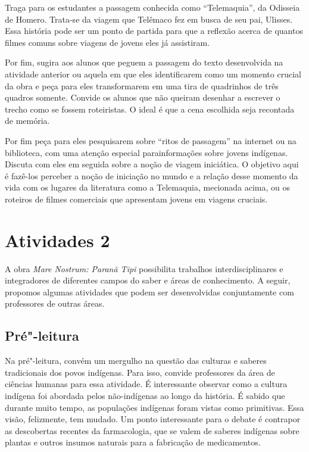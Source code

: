 \documentclass[12pt]{extarticle}
\begin{document}
Traga para os estudantes a passagem conhecida como ``Telemaquia'', da Odisseia de Homero. Trata-se da viagem que Telêmaco fez em busca de seu pai, Ulisses. Essa história pode ser um ponto de partida para que a reflexão acerca de quantos filmes comuns sobre viagens de jovens eles já assistiram.

Por fim, sugira aos alunos 
que peguem a passagem do texto desenvolvida
na atividade anterior ou aquela em que eles identificarem como um
momento crucial da obra e peça para eles transformarem em uma tira de quadrinhos de três quadros somente. Convide os alunos que não queiram desenhar a escrever o trecho como se fossem roteiristas. O ideal é que a cena escolhida seja recontada de memória. 

Por fim peça para eles pesquisarem sobre ``ritos de passagem''
na internet ou na biblioteca, com uma atenção especial parainformações sobre jovens indígenas. Discuta com eles em seguida sobre a noção de viagem iniciática. O objetivo aqui é fazê-los perceber a noção de iniciação no mundo e 
a relação desse momento da vida com os lugares da literatura como 
a Telemaquia, mecionada acima, ou os roteiros de filmes comerciais
que apresentam jovens em viagens cruciais. 


\section{Atividades 2}

A obra \emph{Mare Nostrum: Paranã Tipi} possibilita trabalhos
interdisciplinares e integradores de diferentes campos do saber e áreas de conhecimento. A seguir, propomos algumas atividades que podem ser desenvolvidas conjuntamente com professores de outras áreas.


\subsection{Pré"-leitura}

Na pré"-leitura, convém um mergulho na questão das culturas e
saberes tradicionais dos povos indígenas. Para isso, convide professores da área de ciências humanas para essa atividade. É interessante observar como a cultura indígena foi abordada pelos não-indígenas ao longo da história. É sabido que durante muito tempo, as populações indígenas foram vistas como primitivas. Essa visão, felizmente, tem mudado. Um ponto interessante para o debate é contrapor as descobertas recentes da farmacologia, que se valem de saberes indígenas sobre plantas e outros insumos naturais para a
fabricação de medicamentos.
\end{document}

